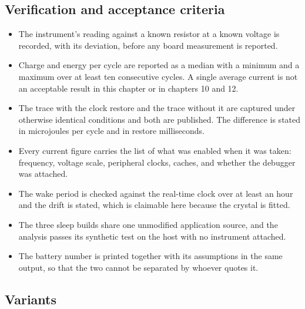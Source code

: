 \subsection*{Verification and acceptance criteria}

\begin{itemize}
\item The instrument's reading against a known resistor at a known voltage is
recorded, with its deviation, before any board measurement is reported.
\item Charge and energy per cycle are reported as a median with a minimum and a
maximum over at least ten consecutive cycles. A single average current is not
an acceptable result in this chapter or in chapters 10 and 12.
\item The trace with the clock restore and the trace without it are captured
under otherwise identical conditions and both are published. The difference is
stated in microjoules per cycle and in restore milliseconds.
\item Every current figure carries the list of what was enabled when it was
taken: frequency, voltage scale, peripheral clocks, caches, and whether the
debugger was attached.
\item The wake period is checked against the real-time clock over at least an
hour and the drift is stated, which is claimable here because the crystal is
fitted.
\item The three sleep builds share one unmodified application source, and the
analysis passes its synthetic test on the host with no instrument attached.
\item The battery number is printed together with its assumptions in the same
output, so that the two cannot be separated by whoever quotes it.
\end{itemize}

\subsection*{Variants}

